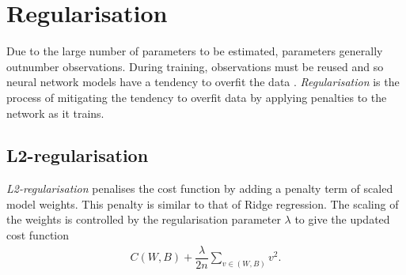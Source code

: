 


\section{Regularisation}\label{nnet-reg}

Due to the large number of parameters to be estimated, parameters generally outnumber observations. During training, observations must be reused and so neural network models have a tendency to overfit the data \cite{Nielson2015}. \textit{Regularisation} is the process of mitigating the tendency to overfit data by applying penalties to the network as it trains.

\subsection*{L2-regularisation}\label{nnet-l2reg}


\textit{L2-regularisation} penalises the cost function by adding a penalty term of scaled model weights. This penalty is similar to that of Ridge regression. The scaling of the weights is controlled by the regularisation parameter $\lambda$ to give the updated cost function
\begin{align}
	C(W,B) + \dfrac{\lambda}{2n}\sum_{v\in (W,B)}v^2.
\end{align}


